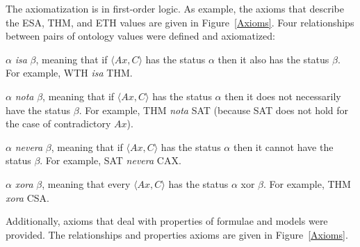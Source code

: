 \documentclass[a4paper]{easychair}
\newenvironment{packed_itemize}{
\vspace*{-0.5em}
\begin{itemize}
  \setlength{\partopsep}{0pt}
  \setlength{\itemsep}{1pt}
  \setlength{\parskip}{0pt}
  \setlength{\parsep}{0pt}
}{\end{itemize}}
\begin{document}
The axiomatization is in first-order logic.
As example, the axioms that describe the ESA, THM, and ETH values are
given in Figure~\ref{Axioms}.
Four relationships between pairs of ontology values were defined and
axiomatized:
\begin{packed_itemize}
\item $\alpha$ {\em isa} $\beta$, meaning that if $\langle Ax, C \rangle$
      has the status $\alpha$ then it also has the status $\beta$.
      For example, WTH {\em isa} THM.
\item $\alpha$ {\em nota} $\beta$, meaning that if $\langle Ax, C \rangle$
      has the status $\alpha$ then it does not necessarily have the status
      $\beta$.
      For example, THM {\em nota} SAT (because SAT does not hold for
      the case of contradictory $Ax$).
\item $\alpha$ {\em nevera} $\beta$, meaning that if $\langle Ax, C \rangle$
      has the status $\alpha$ then it cannot have the status $\beta$.
      For example, SAT {\em nevera} CAX.
\item $\alpha$ {\em xora} $\beta$, meaning that every $\langle Ax, C \rangle$
      has the status $\alpha$ xor $\beta$.
      For example, THM {\em xora} CSA.
\end{packed_itemize}

Additionally, axioms that deal with properties of formulae and models were
provided.
The relationships and properties axioms are given in Figure~\ref{Axioms}.
\end{document}
